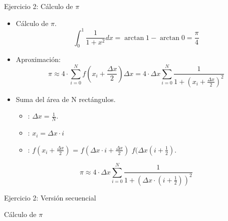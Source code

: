 \begin{frame}[t,shrink=20]{Ejercicio 2: Cálculo de $\pi$}
\begin{itemize}

  \item Cálculo de $\pi$.
\[
\int_{0}^{1} \frac{1}{1+x^2} dx =
\arctan{1} - \arctan{0} =
\frac{\pi}{4}
\]

  \item Aproximación:
\[
\pi \approx 4 \cdot \sum_{i=0}^{N} f(x_{i} + \frac{\Delta x}{2}) \Delta x =
4 \cdot \Delta x \sum_{i=0}^{N} \frac{1}{1 + (x_i + \frac{\Delta x}{2} )^2}
\]

  \item Suma del área de N rectángulos.
    \begin{itemize}
      \item {}: $\Delta x = \frac{1}{N}$.
      \item {}: $x_i = \Delta x \cdot i$
      \item {}: $f(x_i + \frac{\Delta x}{2})$ = $f(\Delta x \cdot i + \frac{\Delta x}{2})$
            $f(\Delta x (i + \frac{1}{2})$.
    \end{itemize}

\[
\pi \approx 
4 \cdot \Delta x \sum_{i=0}^{N} \frac{1}{1 + (\Delta x \cdot (i + \frac{1}{2} ))^2}
\]
\end{itemize}
\end{frame}

\begin{frame}[t]{Ejercicio 2: Versión secuencial}
\begin{block}{Cálculo de $\pi$}

\end{block}
\end{frame}

